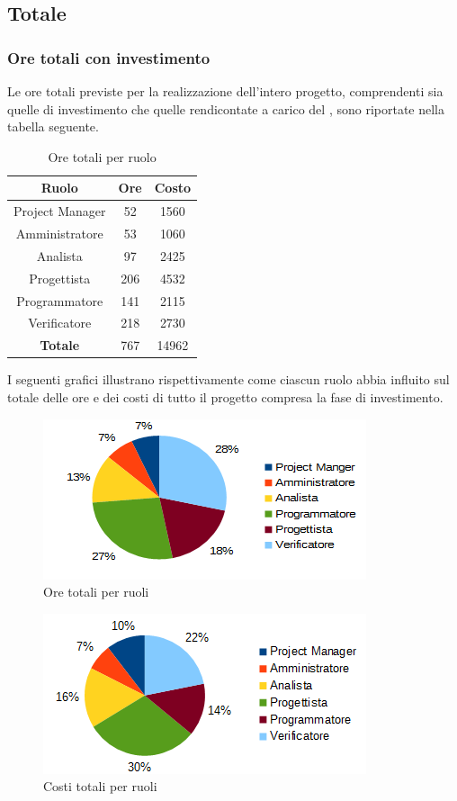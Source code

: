	\subsection{Totale}
		\subsubsection{Ore totali con investimento}
		Le ore totali previste per la realizzazione dell'intero progetto, comprendenti sia quelle di investimento che quelle rendicontate a carico del , sono riportate nella tabella seguente. \\
		\begin{table}[H]
		\centering
		\begin{tabular}{|c|c|c|}
			\hline
			\textbf{Ruolo}		& \textbf{Ore}	& \textbf{Costo} \\
			\hline
			Project Manager		& 52			& 1560	\\
			Amministratore		& 53			& 1060	\\
			Analista			& 97			& 2425	\\
			Progettista			& 206			& 4532	\\
			Programmatore		& 141			& 2115	\\
			Verificatore		& 218			& 2730	\\
			\hline
			\textbf{Totale}		& 767			& 14962	\\
			\hline
		\end{tabular}
		\caption{Ore totali per ruolo}
		\end{table}
		I seguenti grafici illustrano rispettivamente come ciascun ruolo abbia influito sul totale delle ore e dei costi di tutto il progetto compresa la fase di investimento. \\
		\begin{figure}[H]
		\centering
			\includegraphics[scale=1]{immagini/grafici/riepilogo_conclusivo-torta.png}
			\caption{Ore totali per ruoli}
		\end{figure}
		\begin{figure}[H]
			\centering
			\includegraphics[scale=1]{immagini/grafici/riepilogo_conclusivo-torta-costo.png}
			\caption{Costi totali per ruoli}
		\end{figure}
